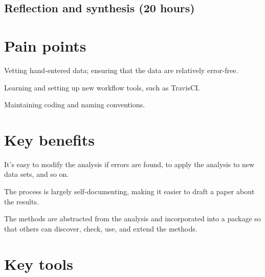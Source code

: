\documentclass[]{article}
\begin{document}
\subsection{Reflection and synthesis (20 hours)}


\section{Pain points}\label{pain-points}


Vetting hand-entered data; ensuring that the data are relatively
error-free.

Learning and setting up new workflow tools, such as TravisCI.

Maintaining coding and naming conventions.

\section{Key benefits}\label{key-benefits}


It's easy to modify the analysis if errors are found, to apply the
analysis to new data sets, and so on.

The process is largely self-documenting, making it easier to draft a
paper about the results.

The methods are abstracted from the analysis and incorporated into a
package so that others can discover, check, use, and extend the
methods.

\section{Key tools}\label{key-tools}

\end{document}
